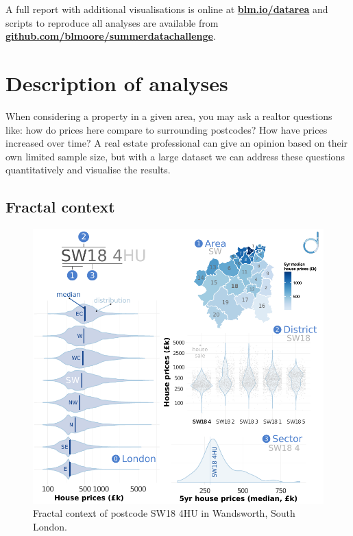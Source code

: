 \documentclass[
10pt, %
a4paper, %
oneside, %
headinclude,footinclude, %
BCOR5mm, %
]{scrartcl}
\begin{document}
A full report with additional visualisations is online at {\bf
  \href{http://blm.io/datarea}{blm.io/datarea} }and scripts to
reproduce all analyses are available from {\bf
  \href{http://github.com/blmoore/summerdatachallenge}{github.com/blmoore/summerdatachallenge}}.


{\let\thefootnote\relax{}}




\section*{Description of analyses}

When considering a property in a given area, you may ask a realtor
questions like: how do prices here compare to surrounding postcodes?
How have prices increased over time?  A real estate professional can
give an opinion based on their own limited sample size, but with a
large dataset we can address these questions quantitatively and
visualise the results.

\subsection{Fractal context}

\setlength{\intextsep}{0em}
\begin{figure}
\begin{center}
\includegraphics[width=.44\textwidth]{Figures/fractal.pdf}
\caption{ Fractal context of postcode SW18 4HU in Wandsworth, South London.}
\end{center}
\end{figure}
\end{document}
